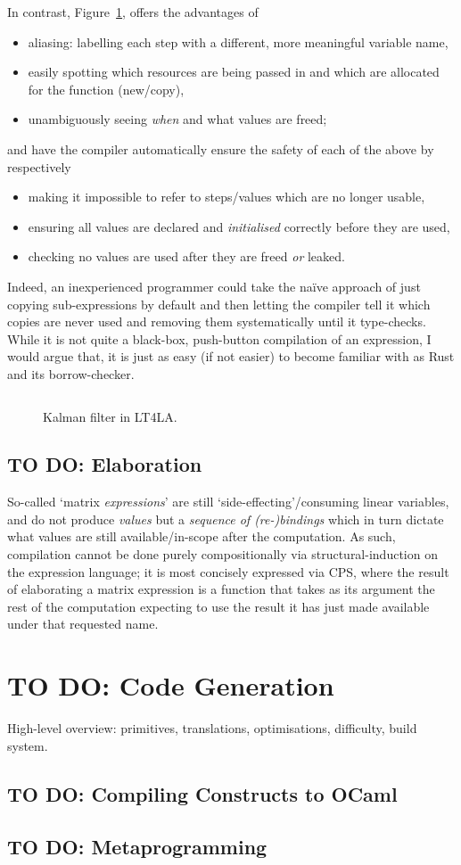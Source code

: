 In contrast, Figure~\ref{fig:ltfla_kalman}, offers the advantages of
\begin{itemize}
    \item aliasing: labelling each step with a different, more meaningful variable name,
    \item easily spotting which resources are being passed in and which are
        allocated for the function (new/copy),
    \item unambiguously seeing \emph{when} and what values are freed;
\end{itemize}
and have the compiler automatically ensure the safety of each of the above by respectively
\begin{itemize}
    \item making it impossible to refer to steps/values which are no longer usable,
    \item ensuring all values are declared and \emph{initialised} correctly before they are used,
    \item checking no values are used after they are freed \emph{or} leaked.
\end{itemize}

Indeed, an inexperienced programmer could take the  na\"ive approach of just
copying sub-expressions by default and then letting the compiler tell it which
copies are never used and removing them systematically until it type-checks.
While it is not quite a black-box, push-button compilation of an expression, I
would argue that, it is just as easy (if not easier) to become familiar with as
Rust and its borrow-checker.

\begin{figure}[tb]
    \inputminted[linenos, fontsize=\small]{ocaml}{../test/examples/kalman.lt}
    \caption{Kalman filter in LT4LA.}\label{fig:ltfla_kalman}
\end{figure}

\subsection{TO DO: Elaboration}

So-called `matrix \emph{expressions}' are still `side-effecting'/consuming
linear variables, and do not produce \emph{values} but a \emph{sequence of
(re-)bindings} which in turn dictate what values are still available/in-scope
after the computation.  As such, compilation cannot be done purely
compositionally via structural-induction on the expression language; it is most
concisely expressed via CPS, where the result of elaborating a matrix
expression is a function that takes as its argument the rest of the computation
expecting to use the result it has just made available under that requested
name.

\section{TO DO: Code Generation}

High-level overview: primitives, translations, optimisations, difficulty, build system.

\subsection{TO DO: Compiling Constructs to OCaml}

\subsection{TO DO: Metaprogramming}
